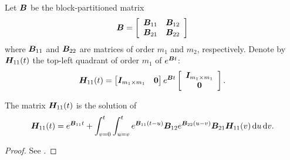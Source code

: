 \begin{lem}[\cite{ln2015}]\label{lem: sfkjgn}
	Let \(\boldsymbol B\) be the block-partitioned matrix
	\[\boldsymbol B = \left[\begin{array}{cc} \boldsymbol B_{11} & \boldsymbol B_{12} \\ \boldsymbol B_{21} & \boldsymbol B_{22} \end{array}\right]\]
	where \(\boldsymbol B_{11}\) and \(\boldsymbol B_{22}\) are matrices of order \(m_1\) and \(m_2\), respectively. Denote by \(\boldsymbol H_{11}(t)\) the top-left quadrant of order \(m_1\) of \(e^{\boldsymbol Bt}\):
	\[\boldsymbol H_{11}(t) = \begin{bmatrix} \boldsymbol I_{m_1\times m_1} & \boldsymbol 0 \end{bmatrix} e^{\boldsymbol Bt}\left[\begin{array}{c}\boldsymbol I_{m_1\times m_1} \\ \boldsymbol 0\end{array}\right].\]
	
	The matrix \(\boldsymbol H_{11}(t)\) is the solution of 
	\begin{align}\label{eqn: akg987LKJ}
		\boldsymbol H_{11}(t) = e^{\boldsymbol B_{11}t} + \int_{v=0}^t\int_{u=v}^t e^{\boldsymbol B_{11}(t-u)}\boldsymbol B_{12}e^{\boldsymbol B_{22}(u-v)}\boldsymbol B_{21}\boldsymbol H_{11}(v)\, \mathrm{d} u\, \mathrm{d} v.
	\end{align}
\end{lem}
\begin{proof}
	See \cite{ln2015}.
\end{proof}

